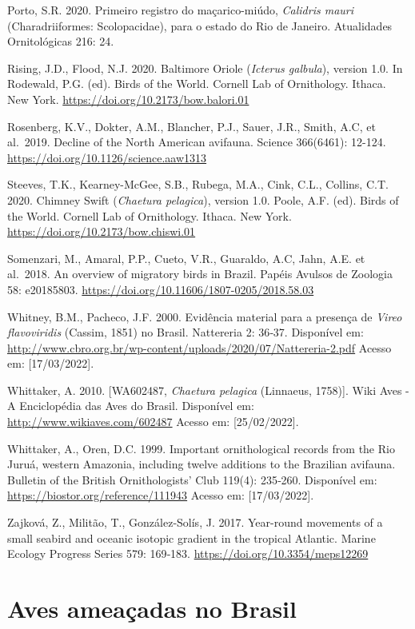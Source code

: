 \documentclass[
  oneside]{scrbook}
\begin{document}
Porto, S.R. 2020. Primeiro registro do maçarico-miúdo, \emph{Calidris mauri} (Charadriiformes: Scolopacidae), para o estado do Rio de Janeiro. Atualidades Ornitológicas 216: 24.

Rising, J.D., Flood, N.J. 2020. Baltimore Oriole (\emph{Icterus galbula}), version 1.0. In Rodewald, P.G. (ed). Birds of the World. Cornell Lab of Ornithology. Ithaca. New York. \url{https://doi.org/10.2173/bow.balori.01}

Rosenberg, K.V., Dokter, A.M., Blancher, P.J., Sauer, J.R., Smith, A.C, et al.~2019. Decline of the North American avifauna. Science 366(6461): 12-124. \url{https://doi.org/10.1126/science.aaw1313}

Steeves, T.K., Kearney-McGee, S.B., Rubega, M.A., Cink, C.L., Collins, C.T. 2020. Chimney Swift (\emph{Chaetura pelagica}), version 1.0. Poole, A.F. (ed). Birds of the World. Cornell Lab of Ornithology. Ithaca. New York. \url{https://doi.org/10.2173/bow.chiswi.01}

Somenzari, M., Amaral, P.P., Cueto, V.R., Guaraldo, A.C, Jahn, A.E. et al.~2018. An overview of migratory birds in Brazil. Papéis Avulsos de Zoologia 58: e20185803. \url{https://doi.org/10.11606/1807-0205/2018.58.03}

Whitney, B.M., Pacheco, J.F. 2000. Evidência material para a presença de \emph{Vireo flavoviridis} (Cassim, 1851) no Brasil. Nattereria 2: 36‑37. Disponível em: \url{http://www.cbro.org.br/wp-content/uploads/2020/07/Nattereria-2.pdf} Acesso em: {[}17/03/2022{]}.

Whittaker, A. 2010. {[}WA602487, \emph{Chaetura pelagica} (Linnaeus, 1758){]}. Wiki Aves - A Enciclopédia das Aves do Brasil. Disponível em: \url{http://www.wikiaves.com/602487} Acesso em: {[}25/02/2022{]}.

Whittaker, A., Oren, D.C. 1999. Important ornithological records from the Rio Juruá, western Amazonia, including twelve additions to the Brazilian avifauna. Bulletin of the British Ornithologists' Club 119(4): 235‑260. Disponível em: \url{https://biostor.org/reference/111943} Acesso em: {[}17/03/2022{]}.

Zajková, Z., Militão, T., González-Solís, J. 2017. Year-round movements of a small seabird and oceanic isotopic gradient in the tropical Atlantic. Marine Ecology Progress Series 579: 169‑183. \url{https://doi.org/10.3354/meps12269}

\hypertarget{cap3}{%
\chapter{Aves ameaçadas no Brasil}\label{cap3}}
\end{document}
